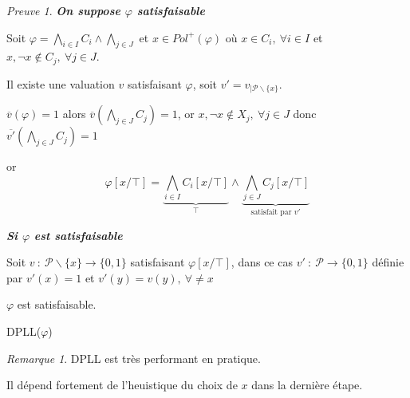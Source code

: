 \documentclass[]{article}
\theoremstyle{remark}
\newtheorem{myrem}{Remarque}
\newtheorem{myproof}{Preuve}
\theoremstyle{definition}
\newcommand{\funcshort}[3]{
#1 ~ : ~ #2 \longrightarrow #3
}
\newenvironment{proofpart}[1]{
	\leavevmode
	
	\noindent
	{\textit{\textbf{\boldmath #1}}}
	
}{
	\checkmark
}
\begin{document}
\begin{myproof}
	\begin{proofpart}{On suppose $\varphi$ satisfaisable}
		Soit $\varphi = \bigwedge_{i \in I} C_i \land \bigwedge_{j \in J}$ et $x \in Pol^+(\varphi)$ où $x \in C_i, ~ \forall i \in I$ et $x, \neg x \notin C_j, ~ \forall j \in J$.

		Il existe une valuation $v$ satisfaisant $\varphi$, soit $v' = v_{| \mathcal{P}\backslash\{x\}}$.
		
		$\overline{v}(\varphi) = 1$ alors $\overline{v}\left(\bigwedge_{j \in J} C_j\right) = 1$, or $x, \neg x \notin X_j, ~ \forall j \in J$ donc $\overline{v'}\left(\bigwedge_{j \in J} C_j\right) = 1$
		
		or $$\varphi[x/\top] = \underbrace{\bigwedge_{i \in I} C_i[x/\top]}_{\top} \land \underbrace{\bigwedge_{j \in J} C_j[x/\top]}_{\text{satisfait par $v'$}}$$
	\end{proofpart}
	
	\begin{proofpart}{Si $\varphi$ est satisfaisable}
		Soit $\funcshort{v}{\mathcal{P}\backslash \{x\}}{\{0, 1\}}$ satisfaisant $\varphi[x/\top]$, dans ce cas $\funcshort{v'}{\mathcal{P}}{\{0, 1\}}$ définie par $v'(x)=1$ et $v'(y)=v(y), ~ \forall \neq x$
		
		$\varphi$ est satisfaisable.
	\end{proofpart}
\end{myproof}

\begin{algorithm}

	\caption{DPLL($\varphi$)}
\end{algorithm}

\begin{myrem}
	DPLL est très performant en pratique.
	
	Il dépend fortement de l'heuistique du choix de $x$ dans la dernière étape.
\end{myrem}
\end{document}
